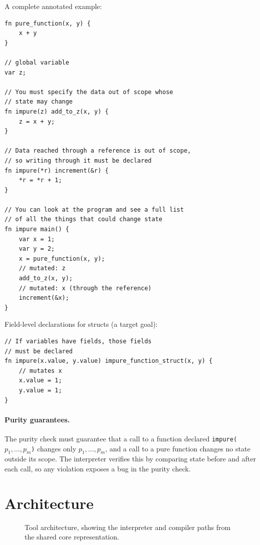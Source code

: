 \documentclass[12pt, letterpaper]{article}
\begin{document}
\noindent A complete annotated example:

\begin{lstlisting}
fn pure_function(x, y) {
    x + y
}

// global variable
var z;

// You must specify the data out of scope whose
// state may change
fn impure(z) add_to_z(x, y) {
    z = x + y;
}

// Data reached through a reference is out of scope,
// so writing through it must be declared
fn impure(*r) increment(&r) {
    *r = *r + 1;
}

// You can look at the program and see a full list
// of all the things that could change state
fn impure main() {
    var x = 1;
    var y = 2;
    x = pure_function(x, y);
    // mutated: z
    add_to_z(x, y);
    // mutated: x (through the reference)
    increment(&x);
}
\end{lstlisting}

\noindent Field-level declarations for structs (a target goal):

\begin{lstlisting}
// If variables have fields, those fields
// must be declared
fn impure(x.value, y.value) impure_function_struct(x, y) {
    // mutates x
    x.value = 1;
    y.value = 1;
}
\end{lstlisting}

\paragraph{Purity guarantees.}
\label{app:guarantees}
The purity check must guarantee that a call to a function declared \texttt{impure(}$p_1, \dots, p_m$\texttt{)} changes only $p_1, \dots, p_m$, and a call to a pure function changes no state outside its scope.
The interpreter verifies this by comparing state before and after each call, so any violation exposes a bug in the purity check.

\section{Architecture}
\label{app:architecture}

\begin{figure}[h]
  \centering
  
  \caption{Tool architecture, showing the interpreter and compiler paths from the shared core representation.}
  \label{fig:architecture}
\end{figure}
\end{document}
